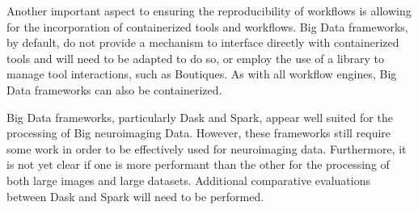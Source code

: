         Another important aspect to ensuring the reproducibility of workflows
        is allowing for the incorporation of containerized tools and workflows.
        Big Data frameworks, by default, do not provide a mechanism to interface
        directly with containerized tools and will need to be adapted to do so,
        or employ the use of a library to manage tool interactions, such as 
        Boutiques. As with all workflow engines, Big Data frameworks can also 
        be containerized.

        Big Data frameworks, particularly Dask and Spark, appear well suited for
        the processing of Big neuroimaging Data. However, these frameworks still
        require some work in order to be effectively used for neuroimaging data.
        Furthermore, it is not yet clear if one is more performant than the other
        for the processing of both large images and large datasets. Additional
        comparative evaluations between Dask and Spark will need to be performed.

